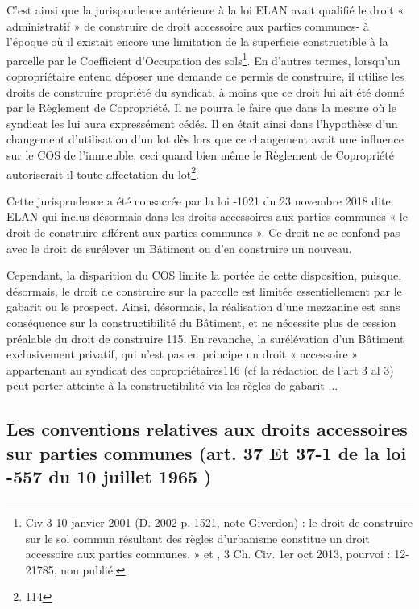 			C’est ainsi que la jurisprudence antérieure à la loi ELAN avait qualifié le droit « administratif » de construire
			de droit accessoire aux parties communes- à l’époque où il existait encore une limitation de la superficie
			constructible à la parcelle par le Coefficient d’Occupation des sols\footnote{Civ 3\degre{} 10 janvier 2001 (D. 2002 p. 1521, note Giverdon) : le droit de construire sur le sol commun résultant des règles	d’urbanisme constitue un droit accessoire aux parties communes. » et , 3\degre{} Ch. Civ. 1er oct 2013, \no pourvoi : 12-21785, non publié. }. En d’autres termes, lorsqu’un
			copropriétaire entend déposer une demande de permis de construire, il utilise les droits de construire
			propriété du syndicat, à moins que ce droit lui ait été donné par le Règlement de Copropriété. Il ne pourra
			le faire que dans la mesure où le syndicat les lui aura expressément cédés. Il en était ainsi dans l’hypothèse
			d’un changement d’utilisation d’un lot dès lors que ce changement avait une influence sur le COS de
			l’immeuble, ceci quand bien même le Règlement de Copropriété autoriserait-il toute affectation du lot\footnote{114}.
			
			Cette jurisprudence a été consacrée par la loi -1021 du 23 novembre 2018 dite ELAN qui inclus
			désormais dans les droits accessoires aux parties communes « le droit de construire afférent aux parties
			communes ». Ce droit ne se confond pas avec le droit de surélever un Bâtiment ou d’en construire un
			nouveau.
			
			Cependant, la disparition du COS limite la portée de cette disposition, puisque, désormais, le droit de
			construire sur la parcelle est limitée essentiellement par le gabarit ou le prospect. Ainsi, désormais, la
			réalisation d’une mezzanine est sans conséquence sur la constructibilité du Bâtiment, et ne nécessite plus
			de cession préalable du droit de construire 115. En revanche, la surélévation d’un Bâtiment exclusivement
			privatif, qui n’est pas en principe un droit « accessoire » appartenant au syndicat des copropriétaires116 (cf
			la rédaction de l’art 3 al 3) peut porter atteinte à la constructibilité via les règles de gabarit $\dots$
	
	\subsection[Conventions de l'article 37]{Les conventions relatives aux droits accessoires sur parties	communes (art. 37 Et 37-1 de la loi -557 du 10 juillet 1965 )}
	
